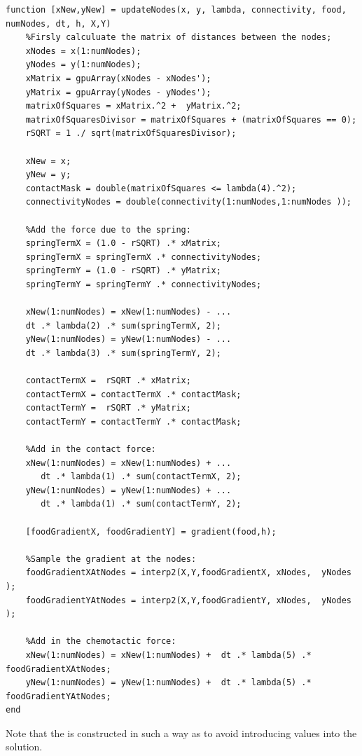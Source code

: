 \begin{lstlisting}[style=Matlab-editor,basicstyle=\lstconsolas,basicstyle=\small,  
                   caption={A code listing for the \textbf{updateNodes.m} script},
                   label={lst:updateNodes}]
function [xNew,yNew] = updateNodes(x, y, lambda, connectivity, food, numNodes, dt, h, X,Y)
    %Firsly calculuate the matrix of distances between the nodes;
    xNodes = x(1:numNodes);
    yNodes = y(1:numNodes);
    xMatrix = gpuArray(xNodes - xNodes');
    yMatrix = gpuArray(yNodes - yNodes');
    matrixOfSquares = xMatrix.^2 +  yMatrix.^2;
    matrixOfSquaresDivisor = matrixOfSquares + (matrixOfSquares == 0);
    rSQRT = 1 ./ sqrt(matrixOfSquaresDivisor);

    xNew = x;
    yNew = y;
    contactMask = double(matrixOfSquares <= lambda(4).^2); 
    connectivityNodes = double(connectivity(1:numNodes,1:numNodes ));

    %Add the force due to the spring:
    springTermX = (1.0 - rSQRT) .* xMatrix;
    springTermX = springTermX .* connectivityNodes;
    springTermY = (1.0 - rSQRT) .* yMatrix;
    springTermY = springTermY .* connectivityNodes;

    xNew(1:numNodes) = xNew(1:numNodes) - ...
    dt .* lambda(2) .* sum(springTermX, 2);   
    yNew(1:numNodes) = yNew(1:numNodes) - ...
    dt .* lambda(3) .* sum(springTermY, 2);

    contactTermX =  rSQRT .* xMatrix;
    contactTermX = contactTermX .* contactMask;
    contactTermY =  rSQRT .* yMatrix;
    contactTermY = contactTermY .* contactMask;
    
    %Add in the contact force:
    xNew(1:numNodes) = xNew(1:numNodes) + ...
       dt .* lambda(1) .* sum(contactTermX, 2);
    yNew(1:numNodes) = yNew(1:numNodes) + ...
       dt .* lambda(1) .* sum(contactTermY, 2);

    [foodGradientX, foodGradientY] = gradient(food,h);

    %Sample the gradient at the nodes:
    foodGradientXAtNodes = interp2(X,Y,foodGradientX, xNodes,  yNodes );
    foodGradientYAtNodes = interp2(X,Y,foodGradientY, xNodes,  yNodes );

    %Add in the chemotactic force:
    xNew(1:numNodes) = xNew(1:numNodes) +  dt .* lambda(5) .* foodGradientXAtNodes;
    yNew(1:numNodes) = yNew(1:numNodes) +  dt .* lambda(5) .* foodGradientYAtNodes;
end
\end{lstlisting}
Note that the  is constructed in such a way 
as to avoid introducing  values into the solution.


